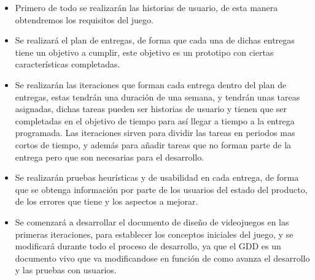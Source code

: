 \begin{itemize}
  \item Primero de todo se realizarán las historias de usuario, de esta manera obtendremos los requisitos del juego.
  \item Se realizará el plan de entregas, de forma que cada una de dichas entregas tiene un objetivo a cumplir, este objetivo es un prototipo con ciertas características completadas.
  \item Se realizarán las iteraciones que forman cada entrega dentro del plan de entregas, estas tendrán una duración de una semana, y tendrán unas tareas asignadas, dichas tareas pueden ser historias de usuario y tienen que ser completadas en el objetivo de tiempo para así llegar a tiempo a la entrega programada. Las iteraciones sirven para dividir las tareas en periodos mas cortos de tiempo, y además para añadir tareas que no forman parte de la entrega pero que son necesarias para el desarrollo.
  \item Se realizarán pruebas heurísticas y de usabilidad en cada entrega, de forma que se obtenga información por parte de los usuarios del estado del producto, de los errores que tiene y los aspectos a mejorar.
  \item Se comenzará a desarrollar el documento de diseño de videojuegos en las primeras iteraciones, para establecer los conceptos iniciales del juego, y se modificará durante todo el proceso de desarrollo, ya que el GDD es un documento vivo que va modificandose en función de como avanza el desarrollo y las pruebas con usuarios.
\end{itemize}
